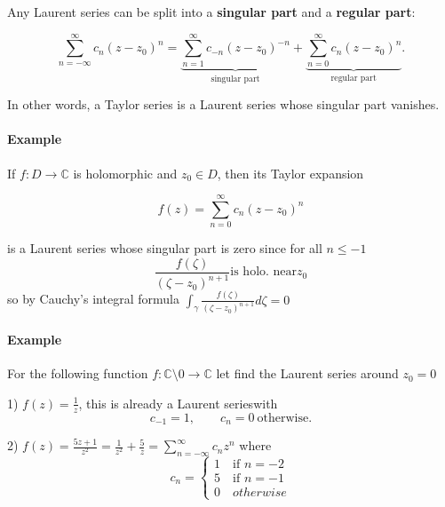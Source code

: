 \begin{definition}[]
 Any Laurent series can be split into a \textbf{singular part} and a
\textbf{regular part}:

\[
\sum_{n=-\infty}^{\infty} c_n (z-z_0)^n
=
\underbrace{\sum_{n=1}^{\infty} c_{-n}(z-z_0)^{-n}}_{\text{singular part}}
+
\underbrace{\sum_{n=0}^{\infty} c_n (z-z_0)^n}_{\text{regular part}} .
\]

 
\end{definition}
In other words, a Taylor series is a Laurent series whose singular
part vanishes.

\paragraph{Example}

If $f : D \to \mathbb{C}$ is holomorphic and $z_0 \in D$,
then its Taylor expansion

\[
f(z)=\sum_{n=0}^{\infty} c_n (z-z_0)^n
\]

is a Laurent series whose singular part is zero since for all $n\leq -1$\[
  \frac{f(\zeta)}{(\zeta-z_0)^{n+1}} \text{is holo. near} z_0
\]
so by Cauchy's integral formula $\int_{\gamma} \frac{f(\zeta)}{(\zeta-z_0)^{n+1}} d\zeta = 0$
\paragraph{Example}

For the following function $f: \mathbb{C}\setminus{0} \to \mathbb{C}$ let find the Laurent series around $z_0 = 0$


1) $f(z)=\frac{1}{z}$, this is already a Laurent serieswith
\[
c_{-1}=1, \qquad c_n=0 \ \text{otherwise}.
\]

2) $f(z) = \frac{5z + 1}{z^2} = \frac{1}{z^2} + \frac{5}{z} = \sum_{n=-\infty}^{\infty}c_nz^n$ where \[
  c_n = 
  \begin{cases}
    1 \quad \text{if }n = -2 \\
    5 \quad \text{if }n = -1 \\
    0 \quad otherwise
  \end{cases}
\]
